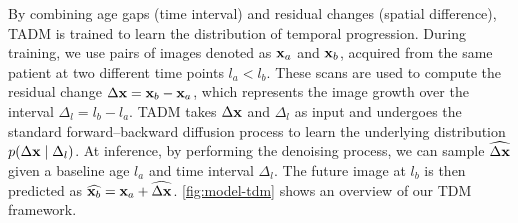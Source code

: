 By combining age gaps (time interval) and residual changes (spatial difference), TADM is trained to learn the distribution of temporal progression. During training, we use pairs of images denoted as ${\mathbf{x}}_a$ and ${\mathbf{x}}_b$, acquired from the same patient at two different time points $l_a < l_b$. These scans are used to compute the residual change $\Delta{\mathbf{x}} = {\mathbf{x}}_b - {\mathbf{x}}_a$, which represents the image growth over the interval $\Delta_l = l_b - l_a$. TADM takes $\Delta{\mathbf{x}}$ and $\Delta_l$ as input and undergoes the standard forward–backward diffusion process to learn the underlying distribution $p(\Delta{\mathbf{x}} \mid \Delta_l)$. At inference, by performing the denoising process, we can sample $\widehat{\Delta{\mathbf{x}}}$ given a baseline age $l_a$ and time interval $\Delta_l$. The future image at $l_b$ is then predicted as $\widehat{{\mathbf{x}}_b} = {\mathbf{x}}_a + \widehat{\Delta{\mathbf{x}}}$. \cref{fig:model-tdm} shows an overview of our TDM framework. 

